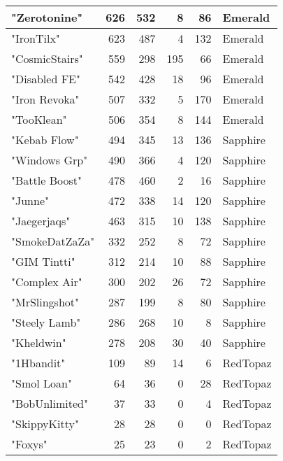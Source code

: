 \documentclass{article}
\begin{document}
\begin{table}[htbp]
\begin{tabular}{|l|r|r|r|r|l|}
"Zerotonine" & 626 & 532 & 8 & 86 & Emerald \\ \hline
"IronTilx" & 623 & 487 & 4 & 132 & Emerald \\ \hline
"CosmicStairs" & 559 & 298 & 195 & 66 & Emerald \\ \hline
"Disabled FE" & 542 & 428 & 18 & 96 & Emerald \\ \hline
"Iron Revoka" & 507 & 332 & 5 & 170 & Emerald \\ \hline
"TooKlean" & 506 & 354 & 8 & 144 & Emerald \\ \hline
"Kebab Flow" & 494 & 345 & 13 & 136 & Sapphire \\ \hline
"Windows Grp" & 490 & 366 & 4 & 120 & Sapphire \\ \hline
"Battle Boost" & 478 & 460 & 2 & 16 & Sapphire \\ \hline
"Junne" & 472 & 338 & 14 & 120 & Sapphire \\ \hline
"Jaegerjaqs" & 463 & 315 & 10 & 138 & Sapphire \\ \hline
"SmokeDatZaZa" & 332 & 252 & 8 & 72 & Sapphire \\ \hline
"GIM Tintti" & 312 & 214 & 10 & 88 & Sapphire \\ \hline
"Complex Air" & 300 & 202 & 26 & 72 & Sapphire \\ \hline
"MrSlingshot" & 287 & 199 & 8 & 80 & Sapphire \\ \hline
"Steely Lamb" & 286 & 268 & 10 & 8 & Sapphire \\ \hline
"Kheldwin" & 278 & 208 & 30 & 40 & Sapphire \\ \hline
"1Hbandit" & 109 & 89 & 14 & 6 & RedTopaz \\ \hline
"Smol Loan" & 64 & 36 & 0 & 28 & RedTopaz \\ \hline
"BobUnlimited" & 37 & 33 & 0 & 4 & RedTopaz \\ \hline
"SkippyKitty" & 28 & 28 & 0 & 0 & RedTopaz \\ \hline
"Foxys" & 25 & 23 & 0 & 2 & RedTopaz \\ \hline
\end{tabular}
\end{table}
\end{document}
